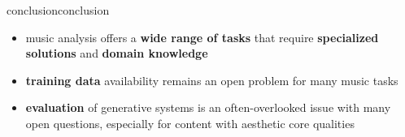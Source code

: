 \begin{frame}{conclusion}{conclusion}

    \begin{itemize}
        \item music analysis offers a \textbf{wide range of tasks} that require \textbf{specialized solutions} and \textbf{domain knowledge}
        \smallskip
        \item \textbf{training data} availability remains an open problem for many music tasks
        \smallskip
        \item \textbf{evaluation} of generative systems is an often-overlooked issue with many open questions, especially for content with aesthetic core qualities
    \end{itemize}
    
\end{frame}

